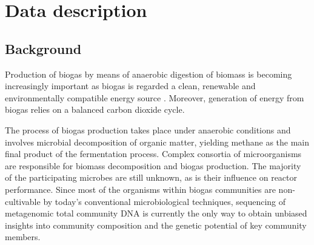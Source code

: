 \documentclass{bmcart}
\begin{document}


\section*{Data description}

\subsection*{Background}
Production of biogas by means of anaerobic digestion of biomass is becoming increasingly important as biogas is regarded a clean, renewable and environmentally compatible energy source \cite{Weiland2010}. Moreover, generation of energy from biogas relies on a balanced carbon dioxide cycle.

The process of biogas production takes place under anaerobic conditions and involves microbial decomposition of organic matter, yielding methane as the main final product of the fermentation process. Complex consortia of microorganisms are responsible for biomass decomposition and biogas production.
The majority of the participating microbes are still unknown, as is their influence on reactor performance. Since most of the organisms within biogas communities are non-cultivable by today’s conventional microbiological techniques, sequencing of metagenomic total community DNA is currently the only way to obtain unbiased insights into community composition and the genetic potential of key community members.
\end{document}
